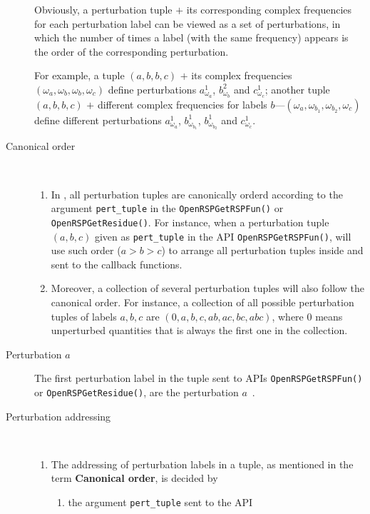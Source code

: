 \begin{description}
    Obviously, a perturbation tuple $+$ its corresponding complex
    frequencies for each perturbation label can be viewed as a set of
    perturbations, in which the number of times a label (with the same
    frequency) appears is the order of the corresponding perturbation.

    For example, a tuple $(a,b,b,c)$ $+$ its complex frequencies
    $(\omega_{a},\omega_{b},\omega_{b},\omega_{c})$ define perturbations
    $a_{\omega_{a}}^{1}$, $b_{\omega_{b}}^{2}$ and $c_{\omega_{c}}^{1}$;
    another tuple $(a,b,b,c)$ $+$ different complex frequencies for labels
    $b$---$(\omega_{a},\omega_{b_{1}},\omega_{b_{2}},\omega_{c})$ define
    different perturbations $a_{\omega_{a}}^{1}$, $b_{\omega_{b_{1}}}^{1}$,
    $b_{\omega_{b_{2}}}^{1}$ and $c_{\omega_{c}}^{1}$.
  \item[Canonical order]~
    \begin{enumerate}
      \item In \LibName, all perturbation tuples are canonically orderd
        according to the argument \texttt{pert\_tuple} in the
        \texttt{OpenRSPGetRSPFun()} or \texttt{OpenRSPGetResidue()}. For
        instance, when a perturbation tuple $(a,b,c)$ given as
        \texttt{pert\_tuple} in the API \texttt{OpenRSPGetRSPFun()},
        \LibName will use such order ($a>b>c$) to arrange all perturbation
        tuples inside and sent to the callback functions.
      \item Moreover, a collection of several perturbation tuples will also
        follow the canonical order. For instance, a collection of all possible
        perturbation tuples of labels $a,b,c$ are $(0,a,b,c,ab,ac,bc,abc)$,
        where $0$ means unperturbed quantities that is always the first one
        in the collection.
    \end{enumerate}
  \item[Perturbation $a$] The first perturbation label in the tuple sent to
    \LibName APIs \texttt{OpenRSPGetRSPFun()} or \texttt{OpenRSPGetResidue()},
    are the perturbation $a$~\cite{Thorvaldsen-JCP-129-214108}.
  \item[Perturbation addressing]~
    \begin{enumerate}
      \item The addressing of perturbation labels in a tuple, as mentioned in
        the term \textbf{Canonical order}, is decided by
        \begin{enumerate}
          \item the argument \texttt{pert\_tuple} sent to the API

\end{enumerate}
\end{enumerate}
\end{description}
